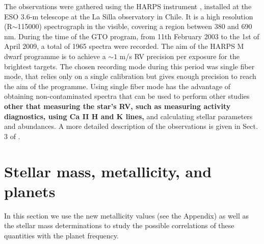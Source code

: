 \documentclass[structabstract]{aa}
\begin{document}
The observations were gathered using the HARPS instrument \citep{Mayor-2003b,Pepe-2004}, installed at the ESO 3.6-m telescope at the La Silla observatory in Chile. It is a high resolution (R$\sim$115000) spectrograph in the visible, covering a region between 380 and 690 nm. During the time of the GTO program, from 11th February 2003 to the 1st of April 2009, a total of 1965 spectra were recorded. The aim of the HARPS M dwarf programme is to achieve a $\sim 1$ m/s RV precision per exposure for the brightest targets. The chosen recording mode during this period was single fiber mode, that relies only on a single calibration but gives enough precision to reach the aim of the programme. Using single fiber mode has the advantage of obtaining non-contaminated spectra that can be used to perform other studies \textbf{other that measuring the star's RV, such as measuring activity diagnostics, using Ca II H and K lines,} and calculating stellar parameters and abundances. A more detailed description of the observations is given in Sect. 3 of \citet{Bonfils-2011}.

\section{Stellar mass, metallicity, and planets}
\label{relation}

In this section we use the new metallicity values (see the Appendix) as well as the stellar mass determinations to study the possible correlations of these quantities with the planet frequency. 





\end{document}
